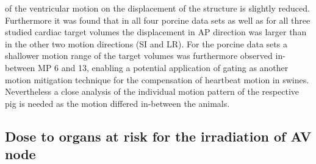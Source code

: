 \documentclass[type=dr, dr=rernat, accentcolor=tud7b,colorbacktitle, bigchapter, openright, twoside, 12pt ]{tudthesis}
\begin{document}
of the ventricular motion on the displacement of the structure is slightly reduced. Furthermore it was found that in all four  
porcine data sets as well as for all three studied cardiac target volumes the displacement in AP direction was larger than in the other two 
motion directions (SI and LR). For the porcine data sets a shallower motion range of the target 
volumes was furthermore observed in-between MP 6 and 13, enabling a potential application of gating as another motion mitigation technique 
for the compensation of heartbeat motion in swines. Nevertheless a close analysis of the individual motion pattern of the respective pig 
is needed as the motion differed in-between the animals. 


\subsection{Dose to organs at risk for the irradiation of AV node}
\end{document}
